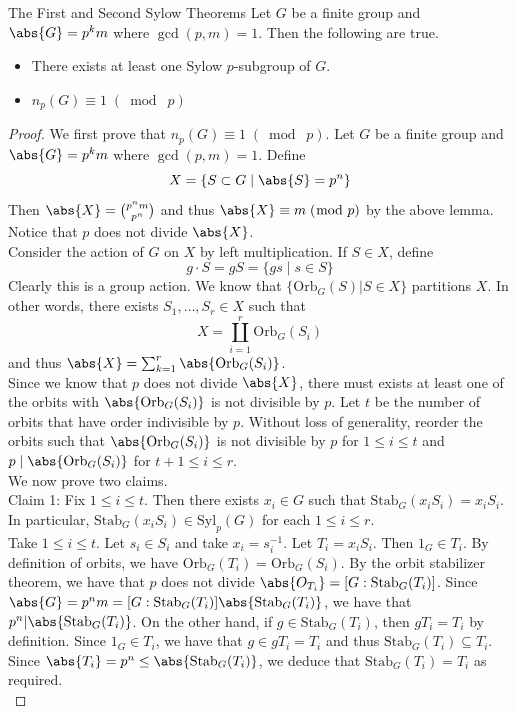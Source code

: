 \documentclass[a4paper]{article}
\begin{document}
\begin{thm}{The First and Second Sylow Theorems}{} Let $G$ be a finite group and $\abs{G}=p^km$ where $\gcd(p,m)=1$. Then the following are true. 
\begin{itemize}
\item There exists at least one Sylow $p$-subgroup of $G$. 
\item $n_p(G)\equiv1\;(\bmod\;p)$
\end{itemize} 
\begin{proof}
We first prove that $n_p(G)\equiv 1\;(\bmod\;p)$. Let $G$ be a finite group and $\abs{G}=p^km$ where $\gcd(p,m)=1$. Define $$X=\{S\subset G\;|\;\abs{S}=p^n\}$$ Then $\abs{X}=\binom{p^nm}{p^n}$ and thus $\abs{X}\equiv m\;(\bmod\;p)$ by the above lemma. Notice that $p$ does not divide $\abs{X}$. \\

Consider the action of $G$ on $X$ by left multiplication. If $S\in X$, define $$g\cdot S=gS=\{gs\;|\;s\in S\}$$ Clearly this is a group action. We know that $\{\text{Orb}_G(S)|S\in X\}$ partitions $X$. In other words, there exists $S_1,\dots,S_r\in X$ such that $$X=\coprod_{i=1}^r\text{Orb}_G(S_i)$$ and thus $\abs{X}=\sum_{k=1}^r\abs{\text{Orb}_G(S_i)}$. \\
Since we know that $p$ does not divide $\abs{X}$, there must exists at least one of the orbits with $\abs{\text{Orb}_G(S_i)}$ is not divisible by $p$. Let $t$ be the number of orbits that have order indivisible by $p$. Without loss of generality, reorder the orbits such that $\abs{\text{Orb}_G(S_i)}$ is not divisible by $p$ for $1\leq i\leq t$ and $p\;|\;\abs{\text{Orb}_G(S_i)}$ for $t+1\leq i\leq r$. \\

We now prove two claims. \\
Claim 1: Fix $1\leq i\leq t$. Then there exists $x_i\in G$ such that $\text{Stab}_G(x_iS_i)=x_iS_i$. In particular, $\text{Stab}_G(x_iS_i)\in\text{Syl}_p(G)$ for each $1\leq i\leq r$. \\
Take $1\leq i\leq t$. Let $s_i\in S_i$ and take $x_i=s_i^{-1}$. Let $T_i=x_iS_i$. Then $1_G\in T_i$. By definition of orbits, we have $\text{Orb}_G(T_i)=\text{Orb}_G(S_i)$. By the orbit stabilizer theorem, we have that $p$ does not divide $\abs{O_{T_i}}=[G:\text{Stab}_G(T_i)]$. Since $\abs{G}=p^nm=[G:\text{Stab}_G(T_i)]\abs{\text{Stab}_G(T_i)}$, we have that $p^n|\abs{\text{Stab}_G(T_i)}$. On the other hand, if $g\in\text{Stab}_G(T_i)$, then $gT_i=T_i$ by definition. Since $1_G\in T_i$, we have that $g\in gT_i=T_i$ and thus $\text{Stab}_G(T_i)\subseteq T_i$. Since $\abs{T_i}=p^n\leq\abs{\text{Stab}_G(T_i)}$, we deduce that $\text{Stab}_G(T_i)=T_i$ as required. \\


\end{proof}
\end{thm}
\end{document}
